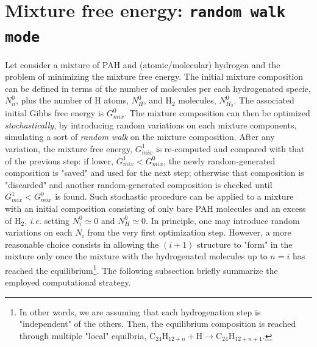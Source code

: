 \documentclass[a4paper, 11pt, twoside]{book}
\begin{document}
\section*{Mixture free energy: \texttt{random walk mode}}
Let consider a mixture of PAH and (atomic/molecular) hydrogen and the problem of minimizing the mixture free energy. The initial mixture composition can be defined in terms of the number of molecules per each hydrogenated specie, $N^0_n$, plus the number of H atoms, $N^0_H$, and $\text{H}_2$ molecules, $N^0_{H_2}$. The associated initial Gibbs free energy is $G_{mix}^0$. The mixture composition can then be optimized \emph{stochastically}, by introducing random variations on each mixture components, simulating a sort of \emph{random walk} on the mixture composition. After any variation,  the mixture free energy, $G_{mix}^{1}$ is re-computed and compared with that of the previous step: if lower, $G_{mix}^1 < G_{mix}^0$, the newly random-generated composition is "saved" and used for the next step; otherwise that composition is "discarded" and another random-generated composition is checked until $G_{mix}^1 < G_{mix}^0$ is found. Such stochastic procedure can be applied to a mixture with an initial composition consisting of only bare PAH molecules and an excess of $\text{H}_2$, \emph{i.e.} setting $N^0_i\simeq 0$ and $N^0_{H}\simeq 0$. In principle, one may introduce random variations on each $N_i$ from the very first optimization step. However, a more reasonable choice consists in allowing the $(i+1)$ structure to "form" in the mixture only once the mixture with the hydrogenated molecules up to $n=i$ has reached the equilibrium\footnote{In other words, we are assuming that each hydrogenation step is "independent" of the others. Then, the equilibrium composition is reached through multiple "local" equilbria, $\text{C}_{24}\text{H}_{12+n} + \text{H} \rightarrow \text{C}_{24}\text{H}_{12+n+1}$.}. The following subsection briefly summarize the employed computational strategy.
\end{document}
